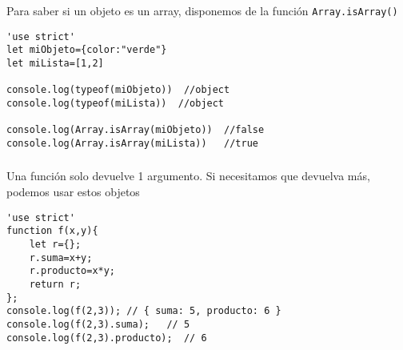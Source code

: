 \documentclass[ucs]{beamer}
\begin{document}
\begin{frame}[fragile]
\frametitle{}
Para saber si un objeto es un array, disponemos de
la función \verb|Array.isArray()|

  \begin{scriptsize}
  \begin{verbatim}
'use strict'
let miObjeto={color:"verde"}
let miLista=[1,2]

console.log(typeof(miObjeto))  //object
console.log(typeof(miLista))  //object

console.log(Array.isArray(miObjeto))  //false
console.log(Array.isArray(miLista))   //true
  \end{verbatim}
  \end{scriptsize}


\end{frame}




\begin{frame}[fragile]
\frametitle{}
Una función solo devuelve 1 argumento. Si necesitamos que devuelva
más, podemos usar estos objetos

  \begin{scriptsize}
  \begin{verbatim}
'use strict'
function f(x,y){
    let r={};
    r.suma=x+y;
    r.producto=x*y;
    return r;
};
console.log(f(2,3)); // { suma: 5, producto: 6 }
console.log(f(2,3).suma);   // 5
console.log(f(2,3).producto);  // 6
  \end{verbatim}
  \end{scriptsize}

\end{frame}
\end{document}
